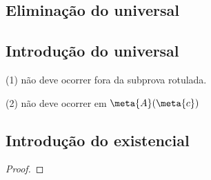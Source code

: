 \begin{multicols}{2}
\subsection*{Eliminação do universal}

\begin{fitchproof}
	 
\end{fitchproof}

\subsection*{Introdução do universal}

\begin{fitchproof}
\open
\close
	 	
\end{fitchproof}

\begin{raggedright}

\textsc{(1)} {\small {} não deve ocorrer fora da subprova rotulada.}

\textsc{(2)} {\small {} não deve ocorrer em $\meta{A}(\meta{c})$}
\end{raggedright}

\subsection*{Introdução do existencial}

\begin{proof}
\end{proof}


\end{multicols}
